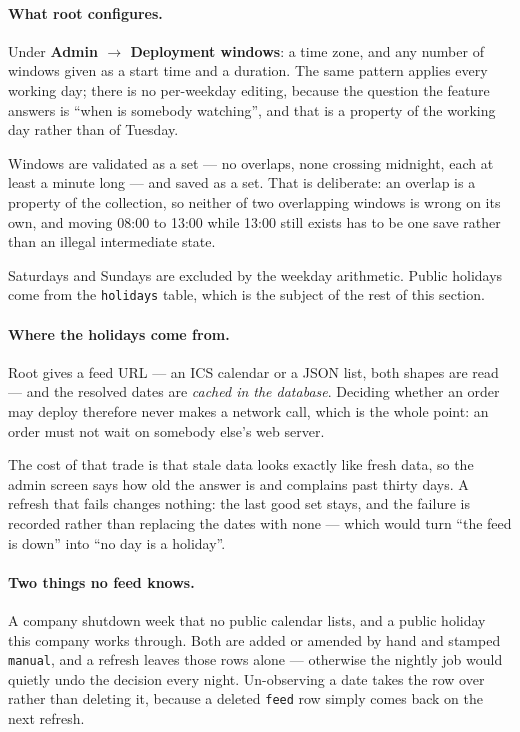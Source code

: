 \documentclass[12pt,a4paper,twoside]{report}
\newcommand{\code}[1]{\texttt{#1}}
\newcommand{\menu}[1]{\textsf{\textbf{#1}}}
\begin{document}
\paragraph{What root configures.} Under \menu{Admin $\rightarrow$ Deployment
windows}: a time zone, and any number of windows given as a start time and a
duration. The same pattern applies every working day; there is no per-weekday
editing, because the question the feature answers is ``when is somebody
watching'', and that is a property of the working day rather than of Tuesday.

Windows are validated as a set --- no overlaps, none crossing midnight, each at
least a minute long --- and saved as a set. That is deliberate: an overlap is a
property of the collection, so neither of two overlapping windows is wrong on
its own, and moving 08:00 to 13:00 while 13:00 still exists has to be one save
rather than an illegal intermediate state.

Saturdays and Sundays are excluded by the weekday arithmetic. Public holidays
come from the \code{holidays} table, which is the subject of the rest of this
section.

\paragraph{Where the holidays come from.} Root gives a feed URL --- an ICS
calendar or a JSON list, both shapes are read --- and the resolved dates are
\emph{cached in the database}. Deciding whether an order may deploy therefore
never makes a network call, which is the whole point: an order must not wait on
somebody else's web server.

The cost of that trade is that stale data looks exactly like fresh data, so the
admin screen says how old the answer is and complains past thirty days. A
refresh that fails changes nothing: the last good set stays, and the failure is
recorded rather than replacing the dates with none --- which would turn ``the
feed is down'' into ``no day is a holiday''.

\paragraph{Two things no feed knows.} A company shutdown week that no public
calendar lists, and a public holiday this company works through. Both are added
or amended by hand and stamped \code{manual}, and a refresh leaves those rows
alone --- otherwise the nightly job would quietly undo the decision every night.
Un-observing a date takes the row over rather than deleting it, because a
deleted \code{feed} row simply comes back on the next refresh.
\end{document}
